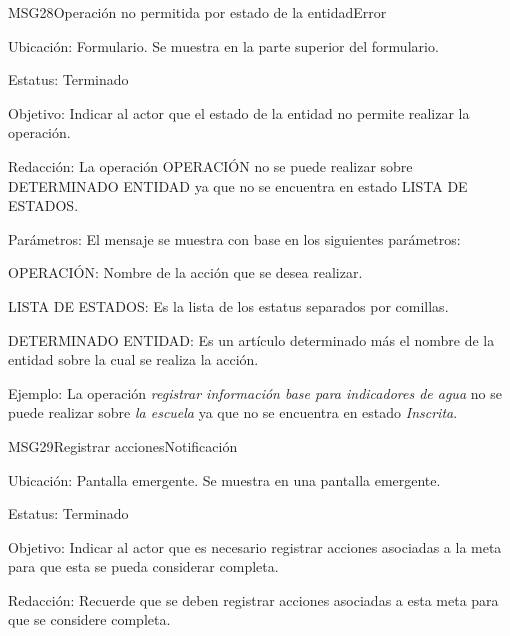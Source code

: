 \begin{mensaje}{MSG28}{Operación no permitida por estado de la entidad}{Error}
\item[Ubicación:] Formulario. Se muestra en la parte superior del formulario.
\item[Estatus:] Terminado
\item[Objetivo:] Indicar al actor que el estado de la entidad no permite realizar la operación.
 	\item[Redacción:] La operación OPERACIÓN no se puede realizar sobre DETERMINADO ENTIDAD ya que no se encuentra en estado LISTA DE ESTADOS.
 	\item[Parámetros:] El mensaje se muestra con base en los siguientes parámetros:
 	\begin{Citemize}
  		\item OPERACIÓN: Nombre de la acción que se desea realizar.
		\item LISTA DE ESTADOS: Es la lista de los estatus separados por comillas.
		\item DETERMINADO ENTIDAD: Es un artículo determinado más el nombre de la entidad sobre la cual se realiza la acción.
 	\end{Citemize}
 	\item[Ejemplo:] La operación {\em registrar información base para indicadores de agua} no se puede realizar sobre {\em la escuela} ya que no se encuentra en estado {\em Inscrita}.
\end{mensaje}
\begin{mensaje}{MSG29}{Registrar acciones}{Notificación}
\item[Ubicación:] Pantalla emergente. Se muestra en una pantalla emergente.
\item[Estatus:] Terminado
\item[Objetivo:] Indicar al actor que es necesario registrar acciones asociadas a la meta para que esta se pueda considerar completa.
\item[Redacción:] Recuerde que se deben registrar acciones asociadas a esta meta para que se considere completa.
\end{mensaje}
